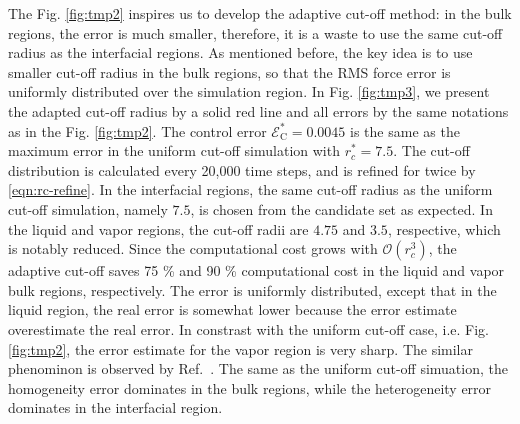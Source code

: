 \documentclass[aps,pre,preprint]{revtex4-1}
\begin{document}
The Fig. \ref{fig:tmp2} inspires us to develop the adaptive cut-off
method: in the bulk regions, the error is much smaller, therefore, it
is a waste to use the same cut-off radius as the interfacial
regions. As mentioned before, the key idea is to use smaller cut-off
radius in the bulk regions, so that the RMS force error is uniformly
distributed over the simulation region. In Fig. \ref{fig:tmp3}, we
present the adapted cut-off radius by a solid red line and all errors
by the same notations as in the Fig. \ref{fig:tmp2}. The control error
$\mathcal E^\ast_{\textrm{C}} = 0.0045$ is the same as the maximum
error in the uniform cut-off simulation with $r_c^\ast=7.5$. The
cut-off distribution is calculated every 20,000 time steps, and is
refined for twice by \eqref{eqn:rc-refine}. In the interfacial
regions, the same cut-off radius as the uniform cut-off simulation,
namely $7.5$, is chosen from the candidate set as expected.  In the
liquid and vapor regions, the cut-off radii are $4.75$ and $3.5$,
respective, which is notably reduced. Since the computational cost
grows with $\mathcal O(r_c^3)$, the adaptive cut-off saves 75 \% and
90 \% computational cost in the liquid and vapor bulk regions,
respectively.  The error is uniformly distributed, except that in the
liquid region, the real error is somewhat lower because the error
estimate overestimate the real error. In constrast with the uniform
cut-off case, i.e. Fig. \ref{fig:tmp2}, the error estimate for the
vapor region is very sharp. The similar phenominon is observed by
Ref.~\cite{wang2011}. The same as the uniform cut-off simuation, the
homogeneity error dominates in the bulk regions, while the
heterogeneity error dominates in the interfacial region.
\end{document}
